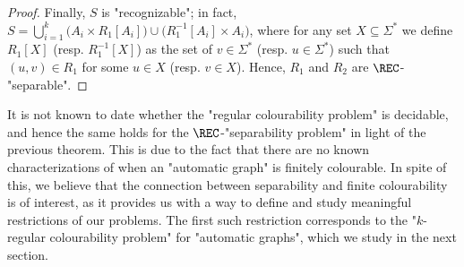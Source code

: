 \begin{proof}
    Finally,  $S$ is "recognizable"; in fact, 
    $S = \bigcup_{i=1}^k \bigl( A_i \times R_1[A_i] \bigr) \cup \bigl( R_1^{-1}[A_i] \times A_i \bigr)$, 
    where for any set $X \subseteq \Sigma^*$ we define $R_1[X]$ (resp. $R_1^{-1}[X]$) as the set
    of $v\in \Sigma^*$ (resp. $u \in \Sigma^*$) such that $(u,v) \in R_1$ for some $u \in X$
    (resp. $v\in X$).
    Hence, $R_1$ and $R_2$ are $\REC$-"separable". 
\end{proof}

It is not known to date whether the "regular colourability problem" is decidable, and hence 
the same holds for the $\REC$-"separability problem"
in light of the previous theorem. This is due to the fact that there are no known characterizations of when an "automatic graph" is finitely colourable. 
In spite of this, we believe that the connection between separability and finite colourability is of interest, as it provides us with a way to define and study meaningful 
restrictions of our problems. The first such restriction corresponds to the "$k$-regular colourability problem" for "automatic graphs", which we study in the next section. 
